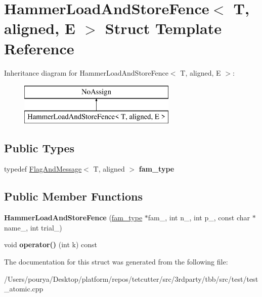 \hypertarget{structHammerLoadAndStoreFence}{}\section{Hammer\+Load\+And\+Store\+Fence$<$ T, aligned, E $>$ Struct Template Reference}
\label{structHammerLoadAndStoreFence}
Inheritance diagram for Hammer\+Load\+And\+Store\+Fence$<$ T, aligned, E $>$\+:\begin{figure}[H]
\begin{center}
\leavevmode
\includegraphics[height=2.000000cm]{structHammerLoadAndStoreFence}
\end{center}
\end{figure}
\subsection*{Public Types}
\begin{DoxyCompactItemize}
\item 
\hypertarget{structHammerLoadAndStoreFence_aff159864ab0f459eafb4e7a8f5a48052}{}typedef \hyperlink{structFlagAndMessage}{Flag\+And\+Message}$<$ T, aligned $>$ {\bfseries fam\+\_\+type}\label{structHammerLoadAndStoreFence_aff159864ab0f459eafb4e7a8f5a48052}

\end{DoxyCompactItemize}
\subsection*{Public Member Functions}
\begin{DoxyCompactItemize}
\item 
\hypertarget{structHammerLoadAndStoreFence_a74168625cfd98fb76fc8e905525b367a}{}{\bfseries Hammer\+Load\+And\+Store\+Fence} (\hyperlink{structFlagAndMessage}{fam\+\_\+type} $\ast$fam\+\_\+, int n\+\_\+, int p\+\_\+, const char $\ast$name\+\_\+, int trial\+\_\+)\label{structHammerLoadAndStoreFence_a74168625cfd98fb76fc8e905525b367a}

\item 
\hypertarget{structHammerLoadAndStoreFence_aa85513501b53e6719de72ea6a760ef4b}{}void {\bfseries operator()} (int k) const \label{structHammerLoadAndStoreFence_aa85513501b53e6719de72ea6a760ef4b}

\end{DoxyCompactItemize}


The documentation for this struct was generated from the following file\+:\begin{DoxyCompactItemize}
\item 
/\+Users/pourya/\+Desktop/platform/repos/tetcutter/src/3rdparty/tbb/src/test/test\+\_\+atomic.\+cpp\end{DoxyCompactItemize}
